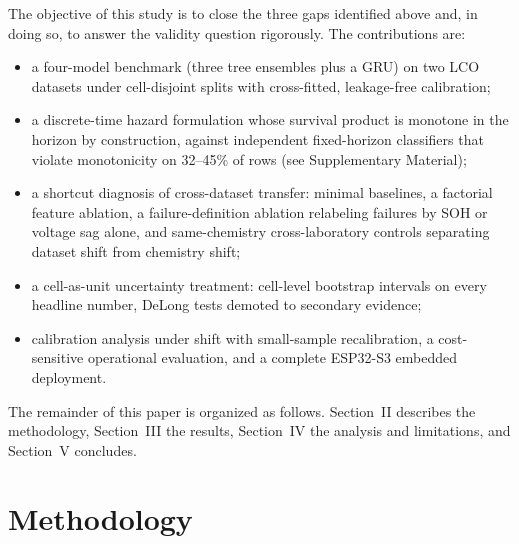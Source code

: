\documentclass[preprint,12pt]{elsarticle}
\begin{document}
The objective of this study is to close the three gaps identified above and, in doing so, to answer the validity question rigorously. The contributions are:
\begin{itemize}
\item a four-model benchmark (three tree ensembles plus a GRU) on two LCO datasets under cell-disjoint splits with cross-fitted, leakage-free calibration;
\item a discrete-time hazard formulation whose survival product is monotone in the horizon by construction, against independent fixed-horizon classifiers that violate monotonicity on 32--45\% of rows (see Supplementary Material);
\item a shortcut diagnosis of cross-dataset transfer: minimal baselines, a factorial feature ablation, a failure-definition ablation relabeling failures by SOH or voltage sag alone, and same-chemistry cross-laboratory controls separating dataset shift from chemistry shift;
\item a cell-as-unit uncertainty treatment: cell-level bootstrap intervals on every headline number, DeLong tests demoted to secondary evidence;
\item calibration analysis under shift with small-sample recalibration, a cost-sensitive operational evaluation, and a complete ESP32-S3 embedded deployment.
\end{itemize}

The remainder of this paper is organized as follows. Section~II describes the methodology, Section~III the results, Section~IV the analysis and limitations, and Section~V concludes.

\section{Methodology}
\end{document}
